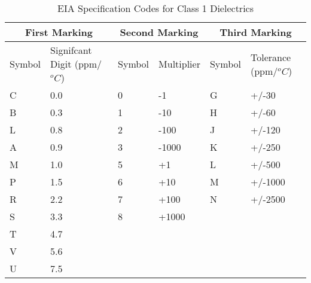             \begin{table}
            \begin{tabular}{| l | l |  l |  l |  l |  l | }
            \hline
            \multicolumn{2}{|c|}{First Marking}                        &    \multicolumn{2}{c|}{Second Marking} &               \multicolumn{2}{c|}{Third Marking} \\ \hline
            Symbol                                          & Signifcant Digit (ppm/$^oC$) & Symbol       & Multiplier & Symbol        & Tolerance (ppm/$^oC$)     \\ \hline
            C                                               & 0.0                        & 0              & -1         & G             & +/-30                     \\ \hline
            B                                               & 0.3                        & 1              & -10        & H             & +/-60                     \\ \hline
            L                                               & 0.8                        & 2              & -100       & J             & +/-120                    \\ \hline
            A                                               & 0.9                        & 3              & -1000      & K             & +/-250                    \\ \hline
            M                                               & 1.0                        & 5              & +1         & L             & +/-500                    \\ \hline
            P                                               & 1.5                        & 6              & +10        & M             & +/-1000                   \\ \hline
            R                                               & 2.2                        & 7              & +100       & N             & +/-2500                   \\ \hline
            S                                               & 3.3                        & 8              & +1000      & ~             & ~                         \\ \hline
            T                                               & 4.7                        & ~              & ~          & ~             & ~                         \\ \hline
            V                                               & 5.6                        & ~              & ~          & ~             & ~                         \\ \hline
            U                                               & 7.5                        & ~              & ~          & ~             & ~                         \\ \hline
            \end{tabular}
            \caption{EIA Specification Codes for Class 1 Dielectrics} \cite{hist_cerFilt}
            \end{table}

